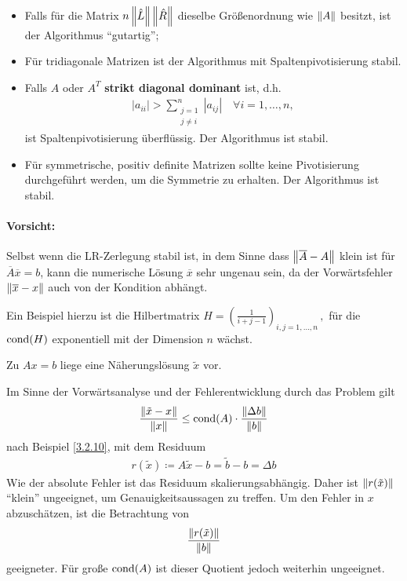 \label{III.3.13}
\begin{itemize}
\item Falls für die Matrix $n\nn[\hat{L}]\nn[\hat{R}]$ 
  dieselbe Größenordnung wie $\nn[A]$ besitzt, ist der
  Algorithmus \enquote{gutartig};
\item Für tridiagonale Matrizen  ist der Algorithmus mit
  Spaltenpivotisierung stabil.
\item Falls $ A$ oder $ A^T$  \textbf{strikt diagonal
    dominant} ist, d.h. 
  \begin{gather*}
    |a_{ii}| > \sum\limits_{\substack{j=1 \\ j \neq i}}^{n} |a_{ij}| 
    \quad \forall i = 1, \dotsc, n,
  \end{gather*}
  ist Spaltenpivotisierung überflüssig. Der Algorithmus ist stabil.
\item Für symmetrische, positiv definite Matrizen sollte keine Pivotisierung
  durchgeführt werden, um die Symmetrie zu erhalten.
  Der Algorithmus ist stabil.
\end{itemize}

\paragraph{Vorsicht:}
Selbst wenn die LR-Zerlegung stabil ist, in dem Sinne dass
$\nn[\overline{A} - A]$ klein ist für
$ \overline{A}\overline{x} = b $, 
kann die numerische Lösung $\overline{ x}$ sehr
ungenau sein, da der Vorwärtsfehler $\nn[\overline{x}-{x}]$ auch von der
Kondition abhängt.

Ein Beispiel hierzu ist die Hilbertmatrix
$  H  =  \left( \frac{1}{i + j -1 } \right)_{i,j= 1,\dotsc, n}\, ,$
für die $\Cond ( H)$ exponentiell mit der Dimension $n$ wächst.


Zu $Ax=b$ liege eine Näherungslösung $\tilde{x}$ vor.

Im Sinne der Vorwärtsanalyse und der Fehlerentwicklung durch das Problem gilt
\begin{gather*}
  \frac{\nn[\tilde{x}-x]}{\nn[x]} 
  \leq \Cond(A) \cdot \frac{\nn[\Delta b]}{\nn[b]}
\end{gather*}
nach Beispiel \ref{3.2.10}, 
mit dem Residuum 
\begin{gather}
  r(\tilde{x})  
   \coloneqq A\tilde{x} - b
  = \widetilde{b}-b
  = \Delta b
 \label{III.4.1}
\end{gather}
Wie der absolute Fehler ist das Residuum skalierungsabhängig.
Daher ist $\nn[r(\tilde{x})]$ \enquote{klein} ungeeignet, um
Genauigkeitsaussagen zu treffen.
Um den Fehler in $x$ abzuschätzen, ist die Betrachtung von 
\begin{gather}
  \frac{\nn[r(\tilde{x})]}{\nn[b]} \label{III.4.2}
\end{gather}
geeigneter. 
Für große $\Cond(A)$ ist dieser Quotient jedoch weiterhin ungeeignet.

